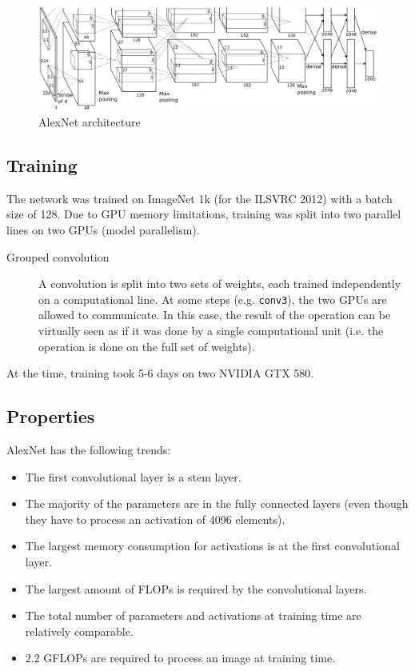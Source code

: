 \begin{figure}[H]
    \centering
    \includegraphics[width=0.75\linewidth]{./img/alexnet.png}
    \caption{AlexNet architecture}
\end{figure}


\subsection{Training}

The network was trained on ImageNet 1k (for the ILSVRC 2012) with a batch size of 128.
Due to GPU memory limitations, training was split into two parallel lines on two GPUs (model parallelism).

\begin{description}
    \item[Grouped convolution] 
        A convolution is split into two sets of weights, each trained independently on a computational line.
        At some steps (e.g. \texttt{conv3}), the two GPUs are allowed to communicate.
        In this case, the result of the operation can be virtually seen as if it was done by a single computational unit (i.e. the operation is done on the full set of weights).
\end{description}

\begin{remark}
    At the time, training took 5-6 days on two NVIDIA GTX 580.
\end{remark}


\subsection{Properties}

AlexNet has the following trends:
\begin{itemize}
    \item The first convolutional layer is a stem layer.
    \item The majority of the parameters are in the fully connected layers (even though they have to process an activation of 4096 elements).
    \item The largest memory consumption for activations is at the first convolutional layer.
    \item The largest amount of FLOPs is required by the convolutional layers.
    \item The total number of parameters and activations at training time are relatively comparable.
    \item $2.2$ GFLOPs are required to process an image at training time.
\end{itemize}

